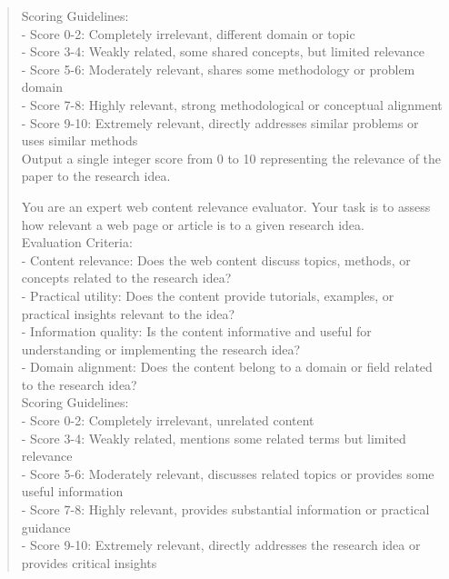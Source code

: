 \begin{quote}
\begin{tcolorbox}[breakable,colback=search!20!white, colframe=search!60!black, title=\textbf{Prompt for Search Agent (Search Results Scoring - Literature)}]
        Scoring Guidelines:\\
        - Score 0-2: Completely irrelevant, different domain or topic\\
        - Score 3-4: Weakly related, some shared concepts, but limited relevance\\
        - Score 5-6: Moderately relevant, shares some methodology or problem domain\\
        - Score 7-8: Highly relevant, strong methodological or conceptual alignment\\
        - Score 9-10: Extremely relevant, directly addresses similar problems or uses similar methods\\

        Output a single integer score from 0 to 10 representing the relevance of the paper to the research idea.
    \end{tcolorbox}

    \begin{tcolorbox}[breakable,colback=search!20!white, colframe=search!60!black, title=\textbf{Prompt for Search Agent (Search Results Scoring - Web)}]
    \label{app:prompt_search_score_web}
        You are an expert web content relevance evaluator. Your task is to assess how relevant a web page or article is to a given research idea.\\

        Evaluation Criteria:\\
        - Content relevance: Does the web content discuss topics, methods, or concepts related to the research idea?\\
        - Practical utility: Does the content provide tutorials, examples, or practical insights relevant to the idea?\\
        - Information quality: Is the content informative and useful for understanding or implementing the research idea?\\
        - Domain alignment: Does the content belong to a domain or field related to the research idea?\\

        Scoring Guidelines:\\
        - Score 0-2: Completely irrelevant, unrelated content\\
        - Score 3-4: Weakly related, mentions some related terms but limited relevance\\
        - Score 5-6: Moderately relevant, discusses related topics or provides some useful information\\
        - Score 7-8: Highly relevant, provides substantial information or practical guidance\\
        - Score 9-10: Extremely relevant, directly addresses the research idea or provides critical insights\\


\end{tcolorbox}
\end{quote}
